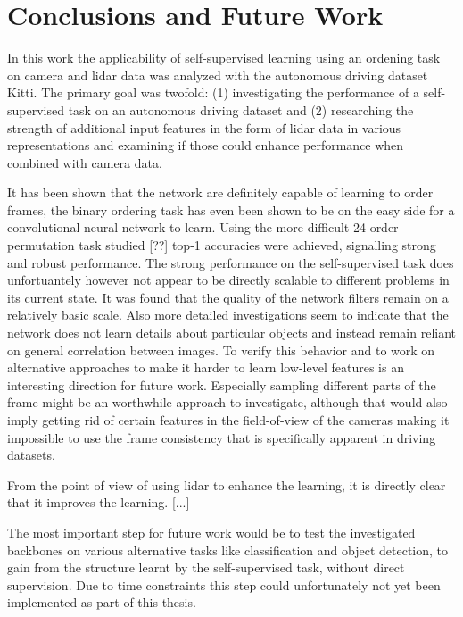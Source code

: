 %

\chapter{Conclusions and Future Work}
In this work the applicability of self-supervised learning using an ordening task on camera and lidar data was analyzed with the autonomous driving dataset Kitti\cite{geiger2012}. The primary goal was twofold: (1) investigating the performance of a self-supervised task on an autonomous driving dataset and (2) researching the strength of additional input features in the form of lidar data in various representations and examining if those could enhance performance when combined with camera data.

It has been shown that the network are definitely capable of learning to order frames, the binary ordering task has even been shown to be on the easy side for a convolutional neural network to learn. Using the more difficult 24-order permutation task studied [??] top-1 accuracies were achieved, signalling strong and robust performance. The strong performance on the self-supervised task does unfortuantely however not appear to be directly scalable to different problems in its current state. It was found that the quality of the network filters remain on a relatively basic scale. Also more detailed investigations seem to indicate that the network does not learn details about particular objects and instead remain reliant on general correlation between images. To verify this behavior and to work on alternative approaches to make it harder to learn low-level features is an interesting direction for future work. Especially sampling different parts of the frame might be an worthwhile approach to investigate, although that would also imply getting rid of certain features in the field-of-view of the cameras making it impossible to use the frame consistency that is specifically apparent in driving datasets.  

From the point of view of using lidar to enhance the learning, it is directly clear that it improves the learning. [...]

The most important step for future work would be to test the investigated backbones on various alternative tasks like classification and object detection, to gain from the structure learnt by the self-supervised task, without direct supervision. Due to time constraints this step could unfortunately not yet been implemented as part of this thesis.
